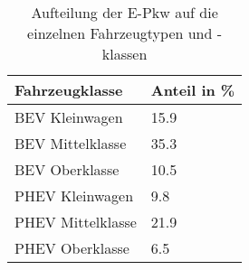 {
\renewcommand{\arraystretch}{1.2}%
\begin{table}[H]
	\begin{center}
		\caption{Aufteilung der E-Pkw auf die einzelnen Fahrzeugtypen und -klassen}
		\begin{tabu} to 0.4\textwidth {X[1.5] X[1, r]}
			\toprule
			Fahrzeugklasse    & Anteil in \si{\percent}  \\ \midrule
			BEV Kleinwagen    & \num{15.9}               \\
			BEV Mittelklasse  & \num{35.3}               \\
			BEV Oberklasse    & \num{10.5}               \\
			PHEV Kleinwagen   & \num{9.8}                \\
			PHEV Mittelklasse & \num{21.9}               \\
			PHEV Oberklasse   & \num{6.5}                \\ \bottomrule
		\end{tabu}
		\label{tab:CarSplit}
	\end{center}
	\vspace{-3mm}%
\end{table}
}